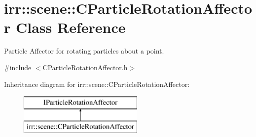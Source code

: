 \hypertarget{classirr_1_1scene_1_1_c_particle_rotation_affector}{\section{irr\-:\-:scene\-:\-:C\-Particle\-Rotation\-Affector Class Reference}
\label{classirr_1_1scene_1_1_c_particle_rotation_affector}
}


Particle Affector for rotating particles about a point.  




{\ttfamily \#include $<$C\-Particle\-Rotation\-Affector.\-h$>$}

Inheritance diagram for irr\-:\-:scene\-:\-:C\-Particle\-Rotation\-Affector\-:\begin{figure}[H]
\begin{center}
\leavevmode
\includegraphics[height=2.000000cm]{classirr_1_1scene_1_1_c_particle_rotation_affector}
\end{center}
\end{figure}
